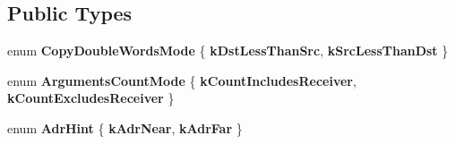 \subsection*{Public Types}
\begin{DoxyCompactItemize}
\item 
\mbox{\label{classv8_1_1internal_1_1TurboAssembler_a997bf5d6eff41d84d74eeee604b53be4}} 
enum {\bfseries Copy\+Double\+Words\+Mode} \{ {\bfseries k\+Dst\+Less\+Than\+Src}, 
{\bfseries k\+Src\+Less\+Than\+Dst}
 \}
\item 
\mbox{\label{classv8_1_1internal_1_1TurboAssembler_a1636dae64a6fe78af92ca87d2fab571b}} 
enum {\bfseries Arguments\+Count\+Mode} \{ {\bfseries k\+Count\+Includes\+Receiver}, 
{\bfseries k\+Count\+Excludes\+Receiver}
 \}
\item 
\mbox{\label{classv8_1_1internal_1_1TurboAssembler_aec11445e6b3b83436855ee4744f37c02}} 
enum {\bfseries Adr\+Hint} \{ {\bfseries k\+Adr\+Near}, 
{\bfseries k\+Adr\+Far}
 \}
\end{DoxyCompactItemize}

